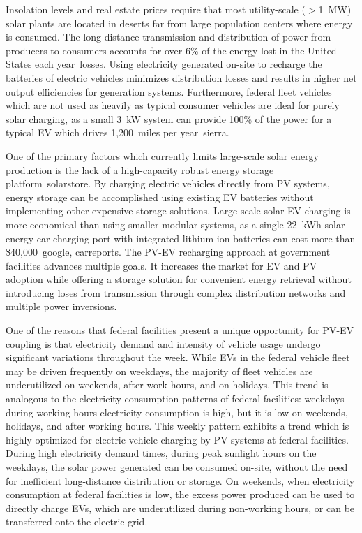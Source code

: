 Insolation levels and real estate prices require that most utility-scale ($>$1~MW) solar plants are located in deserts far from large population centers where energy is consumed. The long-distance transmission and distribution of power from producers to consumers accounts for over 6\% of the energy lost in the United States each year~\cite{eric}{losses}. Using electricity generated on-site to recharge the batteries of electric vehicles minimizes distribution losses and results in higher net output efficiencies for generation systems. Furthermore, federal fleet vehicles which are not used as heavily as typical consumer vehicles are ideal for purely solar charging, as a small 3~kW system can provide 100\% of the power for a typical EV which drives 1,200~miles per year~\cite{eric}{sierra}.

One of the primary factors which currently limits large-scale solar energy production is the lack of a high-capacity robust energy storage platform~\cite{eric}{solarstore}. By charging electric vehicles directly from PV systems, energy storage can be accomplished using existing EV batteries without implementing other expensive storage solutions. Large-scale solar EV charging is more economical than using smaller modular systems, as a single 22~kWh solar energy car charging port with integrated lithium ion batteries can cost more than \$40,000~\cite{eric}{google, carreports}. The PV-EV recharging approach at government facilities advances multiple goals. It increases the market for EV and PV adoption while offering a storage solution for convenient energy retrieval without introducing loses from transmission through complex distribution networks and multiple power inversions. 


One of the reasons that federal facilities present a unique opportunity for PV-EV coupling is that electricity demand and intensity of vehicle usage undergo significant variations throughout the week. While EVs in the federal vehicle fleet may be driven frequently on weekdays, the majority of fleet vehicles are underutilized on weekends, after work hours, and on holidays. This trend is analogous to the electricity consumption patterns of federal facilities: weekdays during working hours electricity consumption is high, but it is low on weekends, holidays, and after working hours. This weekly pattern exhibits a trend which is highly optimized for electric vehicle charging by PV systems at federal facilities. During high electricity demand times, during peak sunlight hours on the weekdays, the solar power generated can be consumed on-site, without the need for inefficient long-distance distribution or storage. On weekends, when electricity consumption at federal facilities is low, the excess power produced can be used to directly charge EVs, which are underutilized during non-working hours, or can be transferred onto the electric grid.



